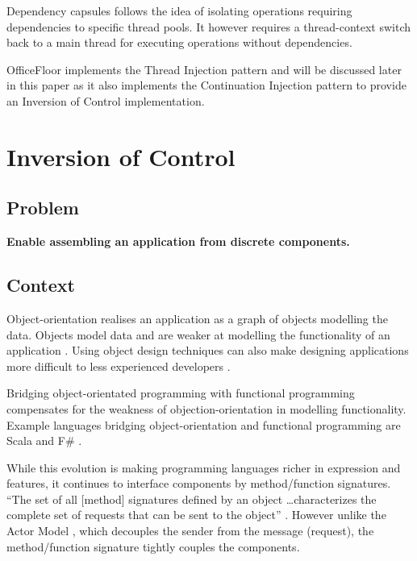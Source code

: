 \documentclass[prodmode]{style/acmlarge}
\begin{document}
Dependency capsules \cite{dependency-capsules} follows the idea of isolating
operations requiring dependencies to specific thread pools.  It however requires
a thread-context switch back to a main thread for executing operations without
dependencies.

OfficeFloor \cite{officefloor} implements the Thread Injection pattern and will
be discussed later in this paper as it also implements the Continuation
Injection pattern to provide an Inversion of Control implementation.



\section{Inversion of Control}


\subsection{Problem}

\textbf{Enable assembling an application from discrete components.}


\subsection{Context}

Object-orientation realises an application as a graph of objects modelling the
data.  Objects model data and are weaker at modelling the functionality of an
application \cite{oo-behaviour}.  Using object design techniques can also make
designing applications more difficult to less experienced developers
\cite{oo-design}.

Bridging object-orientated programming with functional programming
\cite{bridging-function-oo} compensates for the weakness of
objection-orientation in modelling functionality.  Example languages bridging
object-orientation and functional programming are Scala \cite{scala} and F\#
\cite{f-sharp}.

While this evolution is making programming languages richer in expression and
features, it continues to interface components by method/function signatures.
``The set of all [method] signatures defined by an object \ldots characterizes
the complete set of requests that can be sent to the object'' \cite[p. 13]{gof}.
 However unlike the Actor Model \cite{actors}, which decouples the sender from
the message (request), the method/function signature tightly couples the
components.
\end{document}
